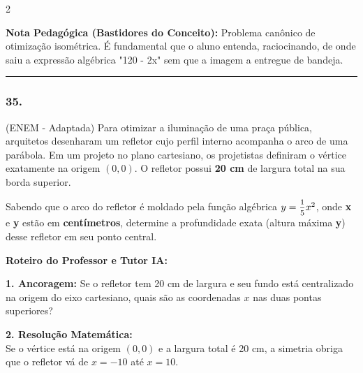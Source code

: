 \begin{multicols*}{2}
    \begin{boxexplicacao}
    \textbf{Nota Pedagógica (Bastidores do Conceito):} Problema canônico de otimização isométrica. É fundamental que o aluno entenda, raciocinando, de onde saiu a expressão algébrica "120 - 2x" sem que a imagem a entregue de bandeja.
    \end{boxexplicacao}
\fi

\par\vspace{\espacoQuestao}

\noindent\textcolor{CorLinha}{\rule{\linewidth}{0.5pt}} 
\par\vspace{\espacoPreQuestao}
\subsubsection*{35.} 
\begin{enunciadoLiteral}
(ENEM - Adaptada) Para otimizar a iluminação de uma praça pública, arquitetos desenharam um refletor cujo perfil interno acompanha o arco de uma parábola. Em um projeto no plano cartesiano, os projetistas definiram o vértice exatamente na origem $(0,0)$. O refletor possui \textbf{20 cm} de largura total na sua borda superior.

Sabendo que o arco do refletor é moldado pela função algébrica $y = \mfrac{1}{5}x^2$, onde \textbf{x} e \textbf{y} estão em \textbf{centímetros}, determine a profundidade exata (altura máxima \textbf{y}) desse refletor em seu ponto central.
\end{enunciadoLiteral}

\ifgabarito
    \begin{tcolorbox}[colback=CorTitUm!5, colframe=CorTitUm, boxrule=1pt, arc=4pt, left=6pt, right=6pt, top=6pt, bottom=6pt]
    \small\textbf{\textcolor{CorTitUm}{Roteiro do Professor e Tutor IA:}}\par\vspace{0.1cm}
    \color{CinzaEscuro}
    \textbf{1. Ancoragem:} Se o refletor tem 20 cm de largura e seu fundo está centralizado na origem do eixo cartesiano, quais são as coordenadas $x$ nas duas pontas superiores?\par\vspace{0.1cm}
    \textbf{2. Resolução Matemática:}\\
    Se o vértice está na origem $(0,0)$ e a largura total é 20 cm, a simetria obriga que o refletor vá de $x = -10$ até $x = 10$.
    

\end{tcolorbox}
\end{multicols*}
